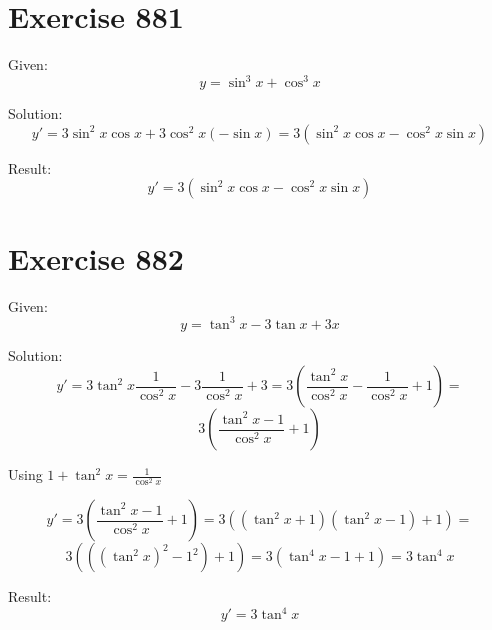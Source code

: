 \documentclass[a4paper, 10pt]{scrartcl}
\begin{document}
\section{Exercise 881}

Given:
\[
y = \sin^{3}{x} + \cos^{3}{x}
\]

Solution:
\[
y' = 3\sin^{2}{x}\cos{x} + 3\cos^{2}{x}(-\sin{x}) = 3(\sin^{2}{x}\cos{x} - \cos^{2}{x}\sin{x})
\]

Result:
\[
y' = 3(\sin^{2}{x}\cos{x} - \cos^{2}{x}\sin{x})
\]

\section{Exercise 882}

Given:
\[
y = \tan^{3}{x} - 3\tan{x} + 3x
\]

Solution:
\[
y' = 3\tan^{2}{x}\frac{1}{\cos^{2}{x}} - 3\frac{1}{\cos^{2}{x}} + 3 = 3(\frac{\tan^{2}{x}}{\cos^{2}{x}} - \frac{1}{\cos^{2}{x}} + 1) =
\]
\[
3(\frac{\tan^{2}{x} - 1}{\cos^{2}{x}} + 1)
\]

Using $1 + \tan^{2}{x} = \frac{1}{\cos^{2}{x}}$

\[
y' = 3(\frac{\tan^{2}{x} - 1}{\cos^{2}{x}} + 1) = 3((\tan^{2}{x} + 1)(\tan^{2}{x} - 1) + 1) =
\]
\[
3(((\tan^{2}{x})^{2} - 1^{2}) + 1) = 3(\tan^{4}{x} - 1 + 1) = 3\tan^{4}{x}
\]

Result:
\[
y' = 3\tan^{4}{x}
\]
\end{document}
